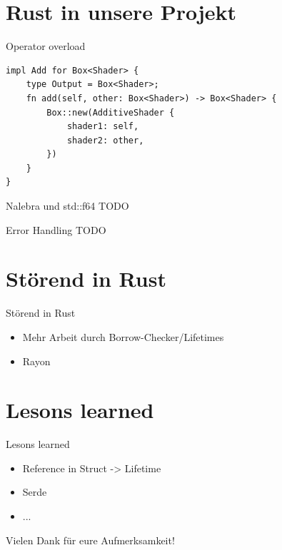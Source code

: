 \documentclass{beamer}
\begin{document}
\section{Rust in unsere Projekt}
\begin{frame}[fragile]{Operator overload}
    \begin{lstlisting}
impl Add for Box<Shader> {
    type Output = Box<Shader>;
    fn add(self, other: Box<Shader>) -> Box<Shader> {
        Box::new(AdditiveShader {
            shader1: self,
            shader2: other,
        })
    }
}
    \end{lstlisting}
\end{frame}
\begin{frame}{Nalebra und std::f64}
    TODO
\end{frame}
\begin{frame}{Error Handling}
    TODO
\end{frame}
\section{Störend in Rust}
\begin{frame}{Störend in Rust}
    \begin{itemize}[<+->]
        \item Mehr Arbeit durch Borrow-Checker/Lifetimes
        \item Rayon 
    \end{itemize}
\end{frame}
\section{Lesons learned}
\begin{frame}{Lesons learned}
    \begin{itemize}[<+->]
        \item Reference in Struct -> Lifetime
        \item Serde
        \item ...
    \end{itemize}
\end{frame}

\begin{frame}[standout]
\centering
\Huge Vielen Dank für eure Aufmerksamkeit!

\end{frame}
\end{document}
